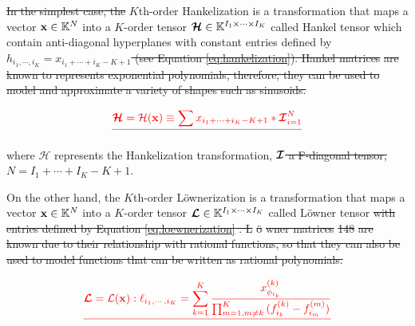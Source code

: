 \documentclass[sensors,article,submit,moreauthors,pdftex]{Definitions/mdpi}
\newcommand{\mathvec}[1]{\boldsymbol{\mathbf{\MakeLowercase{#1}}}}
\newcommand{\mathten}[1]{\boldsymbol{\mathbf{\mathcal{\MakeUppercase{#1}}}}}
\providecommand{\DIFadd}[1]{{\protect\color{blue}\uwave{#1}}} %
\providecommand{\DIFdel}[1]{{\protect\color{red}\sout{#1}}}                      %
\providecommand{\DIFaddbegin}{} %
\providecommand{\DIFaddend}{} %
\providecommand{\DIFdelbegin}{} %
\providecommand{\DIFdelend}{} %
\begin{document}
\DIFdelbegin \DIFdel{In the simplest case, the }\DIFdelend \DIFaddbegin \DIFadd{The }\DIFaddend $K$th-order Hankelization is a transformation that maps a vector $\mathvec{x}\in\mathbb{K}^N$ into a $K$-order tensor \DIFdelbegin \DIFdel{$\mathten{H}\in\mathbb{K}^{I_1 \times \cdots \times I_K}$ }\DIFdelend \DIFaddbegin \DIFadd{$\mathten{H}^{(K)} \in\mathbb{K}^{I_1 \times \cdots \times I_K}$ }\DIFaddend called Hankel tensor which contain anti-diagonal hyperplanes with constant entries defined by \DIFdelbegin \DIFdel{$h_{i_1,\cdots,i_K} = x_{i_1 + \cdots + i_K - K + 1}$ (see Equation \ref{eq:hankelization}). Hankel matrices }%
\DIFdel{are known to represents exponential polynomials, therefore, they can be used to model and approximate a variety of shapes such as sinusoids.
}%

\begin{displaymath}
\DIFdel{\mathten{H} = \mathcal{H}(\mathvec{x}) \equiv \sum{x_{i_1 + \cdots + i_K - K + 1}*\mathten{I}}_{i=1}^{N}
}\end{displaymath}%

\DIFdelend \DIFaddbegin \DIFadd{Equation \ref{eq:hankelization}, }\DIFaddend where $\mathcal{H}$ represents the Hankelization transformation, \DIFdelbegin \DIFdel{$\mathten{I}$ a F-diagonal tensor, }\DIFdelend \DIFaddbegin \DIFadd{and }\DIFaddend $N = I_1 + \cdots + I_K - K + 1$.  \DIFdelbegin %

\DIFdelend On the other hand, the $K$th-order L{\"o}wnerization is a transformation that maps a vector $\mathvec{x}\in\mathbb{K}^N$ into a $K$-order tensor $\mathten{L}\in\mathbb{K}^{I_1 \times \cdots \times I_K}$ called L{\"o}wner tensor \DIFdelbegin \DIFdel{with entries defined by Equation \ref{eq:loewnerization} . L}%
\DIFdel{\"o}%
\DIFdel{wner matrices }%
\DIFdel{148}%
\DIFdel{are known due to their relationship with rational functions, so that they can also be used to model functions that can be written as rational polynomials.
}%

\begin{displaymath}
\DIFdel{\mathten{L} = \mathcal{L}(\mathvec{x}) : \ell_{i_1,\cdots,i_K} = \sum_{k=1}^{K}{\frac{x_{\phi_{i_k}}^{(k)}}{\prod_{m=1,m\neq k}^{K}{(f_{i_k}^{(k)}-f_{i_m}^{(m)})}}}
}\end{displaymath}%
\end{document}
